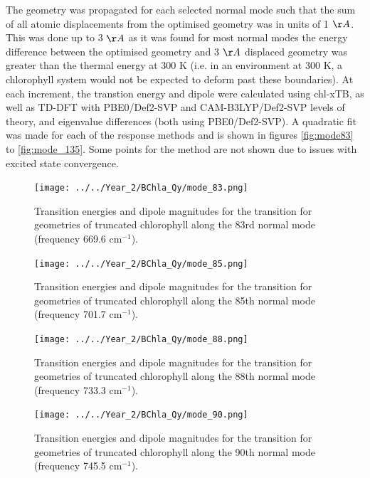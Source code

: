 The geometry was propagated for each selected normal mode such that the sum of
all atomic displacements from the optimised geometry was in units of 1 $\AA{}$.
This was done up to 3 $\AA{}$ as it was found for most normal modes the energy 
difference between the optimised geometry and 3 $\AA{}$ displaced geometry was greater
than the thermal energy at 300 K (i.e. in an environment at 300 K, a chlorophyll 
system would not be expected to deform past these boundaries). At each increment,
the \Qy transtion energy and dipole were calculated using chl-xTB, as well as TD-DFT
with PBE0/Def2-SVP and CAM-B3LYP/Def2-SVP levels of theory, \dscf and eigenvalue 
differences (both using PBE0/Def2-SVP). A quadratic fit was made for each of the
response methods and is shown in figures \ref{fig:mode83} to \ref{fig:mode_135}. 
Some points for the \dscf method are not shown due to issues with excited state 
convergence.

\begin{figure}
    \centering
    \texttt{[image: ../../Year\_2/BChla\_Qy/mode\_83.png]}
    \caption{Transition energies and dipole magnitudes for the \Qy transition for
    geometries of truncated chlorophyll along the 83rd normal mode (frequency 669.6
    $\text{cm}^{-1}$).}
    \label{fig:mode_83}
\end{figure}

\begin{figure}
    \centering
    \texttt{[image: ../../Year\_2/BChla\_Qy/mode\_85.png]}
    \caption{Transition energies and dipole magnitudes for the \Qy transition for
    geometries of truncated chlorophyll along the 85th normal mode (frequency 701.7
    $\text{cm}^{-1}$).}
    \label{fig:mode_85}
\end{figure}

\begin{figure}
    \centering
    \texttt{[image: ../../Year\_2/BChla\_Qy/mode\_88.png]}
    \caption{Transition energies and dipole magnitudes for the \Qy transition for
    geometries of truncated chlorophyll along the 88th normal mode (frequency 733.3
    $\text{cm}^{-1}$).}
    \label{fig:mode_88}
\end{figure}

\begin{figure}
    \centering
    \texttt{[image: ../../Year\_2/BChla\_Qy/mode\_90.png]}
    \caption{Transition energies and dipole magnitudes for the \Qy transition for
    geometries of truncated chlorophyll along the 90th normal mode (frequency 745.5
    $\text{cm}^{-1}$).}
    \label{fig:mode_90}
\end{figure}

